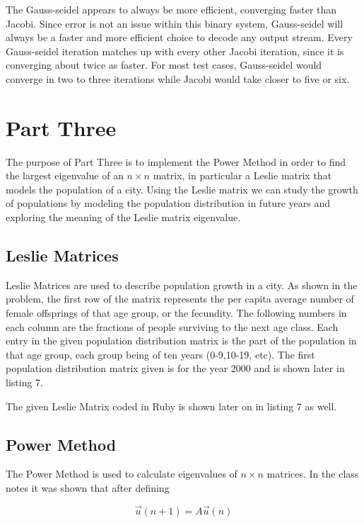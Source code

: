 \documentclass[letterpaper,12pt]{article}
\begin{document}
The Gauss-seidel appears to always be more efficient, converging faster than Jacobi.
Since error is not an issue within this binary system, Gauss-seidel will always be
a faster and more efficient choice to decode any output stream.
Every Gauss-seidel iteration matches up with every other Jacobi iteration, since it
is converging about twice as faster.
For most test cases, Gauss-seidel would converge in two to three iterations while
Jacobi would take closer to five or six.

\newpage
\section{Part Three}


The purpose of Part Three is to implement the Power Method in order to find the
largest eigenvalue of an $n \times n$ matrix, in particular a Leslie matrix that
models the population of a city. Using the Leslie matrix we can study the growth of populations by modeling the population distribution in future years and exploring the meaning of the Leslie matrix eigenvalue.

\subsection{Leslie Matrices}

Leslie Matrices are used to describe population growth in a city.
As shown in the problem, the first row of the matrix represents the per capita
average number of female offsprings of that age group, or the fecundity.
The following numbers in each column are the fractions of people surviving to the
next age class.
Each entry in the given population distribution matrix is the part of the
population in that age group, each group being of ten years (0-9,10-19, etc).
The first population distribution matrix given is for the year 2000 and is shown
later in listing 7.

The given Leslie Matrix coded in Ruby is shown later on in listing 7 as well.

\subsection{Power Method}

The Power Method is used to calculate eigenvalues of $n \times n$ matrices.
In the class notes it was shown that after defining 

\[\vec{u}(n+1) = A\vec{u}(n)\]
\end{document}
